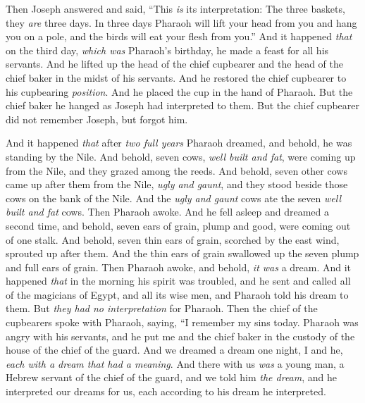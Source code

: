 \begin{biblechapter}
\verse Then Joseph answered and said, “This \textit{is} its interpretation: The three baskets, they \textit{are} three days.
\verse In three days Pharaoh will lift your head from you and hang you on a pole, and the birds will eat your flesh from you.”
\verse And it happened \textit{that} on the third day, \textit{which was} Pharaoh’s birthday, he made a feast for all his servants. And he lifted up the head of the chief cupbearer and the head of the chief baker in the midst of his servants.
\verse And he restored the chief cupbearer to his cupbearing \textit{position}. And he placed the cup in the hand of Pharaoh.
\verse But the chief baker he hanged as Joseph had interpreted to them.
\verse But the chief cupbearer did not remember Joseph, but forgot him.
\end{biblechapter}

\begin{biblechapter} %
 And it happened \textit{that} after \textit{two full years} Pharaoh dreamed, and behold, he was standing by the Nile.
\verse And behold, seven cows, \textit{well built and fat}, were coming up from the Nile, and they grazed among the reeds.
\verse And behold, seven other cows came up after them from the Nile, \textit{ugly and gaunt}, and they stood beside those cows on the bank of the Nile.
\verse And the \textit{ugly and gaunt} cows ate the seven \textit{well built and fat} cows. Then Pharaoh awoke.
\verse And he fell asleep and dreamed a second time, and behold, seven ears of grain, plump and good, were coming out of one stalk.
\verse And behold, seven thin ears of grain, scorched by the east wind, sprouted up after them.
\verse And the thin ears of grain swallowed up the seven plump and full ears of grain. Then Pharaoh awoke, and behold, \textit{it was} a dream.
\verse And it happened \textit{that} in the morning his spirit was troubled, and he sent and called all of the magicians of Egypt, and all its wise men, and Pharaoh told his dream to them. But \textit{they had no interpretation} for Pharaoh.
\verse Then the chief of the cupbearers spoke with Pharaoh, saying, “I remember my sins today.
\verse Pharaoh was angry with his servants, and he put me and the chief baker in the custody of the house of the chief of the guard.
\verse And we dreamed a dream one night, I and he, \textit{each with a dream that had a meaning}.
\verse And there with us \textit{was} a young man, a Hebrew servant of the chief of the guard, and we told him \textit{the dream}, and he interpreted our dreams for us, each according to his dream he interpreted.

\end{biblechapter}
